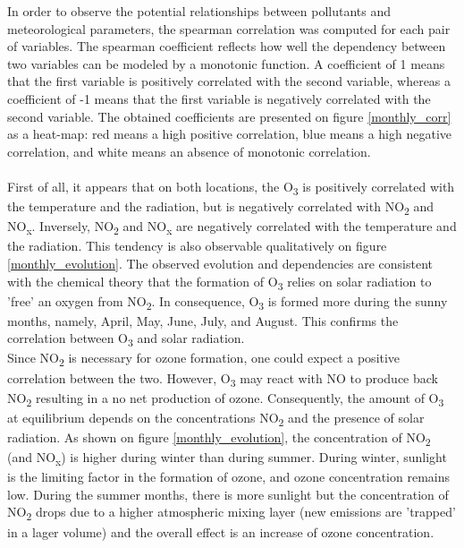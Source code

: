 \documentclass[a4paper, 12pt]{article}
\begin{document}
    In order to observe the potential relationships between pollutants and meteorological parameters, the spearman correlation was computed for each pair of variables. The spearman coefficient reflects how well the dependency between two variables can be modeled by a monotonic function. A coefficient of 1 means that the first variable is positively correlated with the second variable, whereas a coefficient of -1 means that the first variable is negatively correlated with the second variable. The obtained coefficients are presented on figure \ref{monthly_corr} as a heat-map: red means a high positive correlation, blue means a high negative correlation, and white means an absence of monotonic correlation.   
    \\
    \\
    First of all, it appears that on both locations, the O\textsubscript{3} is positively correlated with the temperature and the radiation, but is negatively correlated with NO\textsubscript{2} and NO\textsubscript{x}. Inversely, NO\textsubscript{2} and NO\textsubscript{x} are negatively correlated with the temperature and the radiation. This tendency is also observable qualitatively on figure \ref{monthly_evolution}. The observed evolution and dependencies are consistent with the chemical theory that the formation of O\textsubscript{3} relies on solar radiation to 'free' an oxygen from NO\textsubscript{2}. In consequence, O\textsubscript{3} is formed more during the sunny months, namely, April, May, June, July, and August. This confirms the correlation between O\textsubscript{3} and solar radiation. 
    \\ 
    Since NO\textsubscript{2} is necessary for ozone formation, one could expect a positive correlation between the two. However, O\textsubscript{3} may react with NO to produce back NO\textsubscript{2} resulting in a no net production of ozone. Consequently, the amount of O\textsubscript{3} at equilibrium depends on the concentrations NO\textsubscript{2} and the presence of solar radiation. As shown on figure \ref{monthly_evolution}, the concentration of NO\textsubscript{2} (and NO\textsubscript{x}) is higher during winter than during summer. During winter, sunlight is the limiting factor in the formation of ozone, and ozone concentration remains low. During the summer months, there is more sunlight but the concentration of NO\textsubscript{2} drops due to a higher atmospheric mixing layer (new emissions are 'trapped' in a lager volume) and the overall effect is an increase of ozone concentration.
    \\
\end{document}
